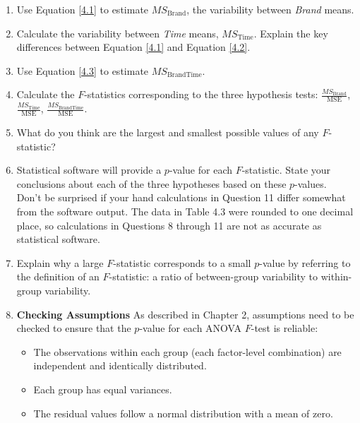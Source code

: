 \documentclass[
]{report}
\begin{document}
\begin{enumerate}
\def\labelenumi{\arabic{enumi}.}
\setcounter{enumi}{7}
\item
  Use Equation \ref{4.1} to estimate \(\scriptstyle MS_{\text{Brand}}\), the variability between \emph{Brand} means.
\item
  Calculate the variability between \emph{Time} means, \(\scriptstyle MS_{\text{Time}}\). Explain the key differences between Equation \ref{4.1} and Equation \ref{4.2}.
\item
  Use Equation \ref{4.3} to estimate \(\scriptstyle MS_{\text{BrandTime}}\).
\item
  Calculate the \(\scriptstyle F\)-statistics corresponding to the three hypothesis tests: \(\scriptstyle \frac{MS_{\text{Brand}}}{\text{MSE}}\), \(\scriptstyle \frac{MS_{\text{Time}}}{\text{MSE}}\), \(\scriptstyle \frac{MS_{\text{BrandTime}}}{\text{MSE}}\).
\item
  What do you think are the largest and smallest possible values of any \(\scriptstyle F\)-statistic?
\item
  Statistical software will provide a \(\scriptstyle p\)-value for each \(\scriptstyle F\)-statistic. State your conclusions about each of the three hypotheses based on these \(\scriptstyle p\)-values.\\
  Don't be surprised if your hand calculations in Question 11 differ somewhat from the software output. The data in Table 4.3 were rounded to one decimal place, so calculations in Questions 8 through 11 are not as accurate as statistical software.
\item
  Explain why a large \(\scriptstyle F\)-statistic corresponds to a small \(\scriptstyle p\)-value by referring to the definition of an \(\scriptstyle F\)-statistic: a ratio of between-group variability to within-group variability.
\item
  \textbf{Checking Assumptions} As described in Chapter 2, assumptions need to be checked to ensure that the \(\scriptstyle p\)-value for each ANOVA \(\scriptstyle F\)-test is reliable:
  \vspace{-1em}

  \begin{itemize}
  \item The observations within each group (each factor-level combination) are independent and identically distributed.
  \item Each group has equal variances.
  \item The residual values follow a normal distribution with a mean of zero.
  \end{itemize}
\end{enumerate}
\end{document}
